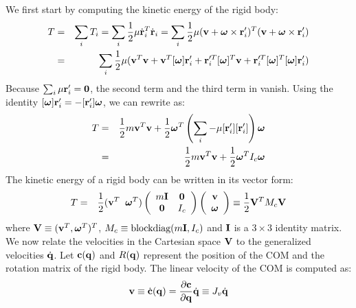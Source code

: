 We first start by computing the kinetic energy of the rigid body:
\begin{eqnarray}
\label{eq:rigid_kinetic}
T &=& \sum_i T_i = \sum_i \frac{1}{2}  \mathbf{\mu} \dot{\mathbf{r}}_i^{T}
    \dot{\mathbf{r}}_i = \sum_i \frac{1}{2}  \mathbf{\mu} (\mathbf{v} + \bm{\omega}
    \times \mathbf{r}_i')^T (\mathbf{v} + \boldsymbol{\bm{\omega}}
    \times \mathbf{r}_i') \nonumber \\
 &=& \sum_i \frac{1}{2}  \mathbf{\mu} (\mathbf{v}^T\mathbf{v} +
    \mathbf{v}^T [\bm{\omega}] \mathbf{r}_i' + \mathbf{r}_i'^T [\bm{\omega}]^T \mathbf{v} +
    \mathbf{r}_i'^T [\bm{\omega}]^T [\bm{\omega}] \mathbf{r}_i')
\end{eqnarray}
Because $\sum_i \mathbf{\mu}
\mathbf{r}_i' = \mathbf{0}$, the second term and the third term in  vanish. Using the identity $[\bm{\omega}]\mathbf{r}_i' =
-[\mathbf{r}_i']\bm{\omega}$, we can rewrite 
as:
\begin{eqnarray}
\nonumber
T & = & \frac{1}{2} m \mathbf{v}^T\mathbf{v} + \frac{1}{2} \bm{\omega}^T \left ( \sum_i -\mathbf{\mu}
 [\mathbf{r}_i'][\mathbf{r}_i'] \right ) \bm{\omega}\\
 & = & \frac{1}{2} m \mathbf{v}^T\mathbf{v} + \frac{1}{2} \bm{\omega}^T I_c \bm{\omega}
\end{eqnarray}
The kinetic energy of a rigid body can be written in its vector form:
\begin{eqnarray}
\label{eq:kinetic_vec}
T &=& \frac{1}{2} (\mathbf{v}^T \;\; \bm{\omega}^T)
\left(
\begin{array}{cc}
m\mathbf{I} & \mathbf{0} \\
\mathbf{0} & I_c
\end{array}
\right)
\left(
\begin{array}{c}
\mathbf{v} \\
\bm{\omega} 
\end{array}
\right)
 \equiv \frac{1}{2}\mathbf{V}^T M_c \mathbf{V}
\end{eqnarray}
where $\mathbf{V} \equiv (\mathbf{v}^T,\bm{\omega}^T)^T$, $M_c \equiv \mbox{blockdiag}(m\mathbf{I},I_c)$ and $\mathbf{I}$ is a $3\times3$ identity matrix. We now relate the velocities in the Cartesian space $\mathbf{V}$ to the generalized velocities $\dot{\mathbf{q}}$. Let $\mathbf{c}(\mathbf{q})$ and $R(\mathbf{q})$ represent the position of the COM and the rotation matrix of the rigid body. The linear velocity of the COM is computed as:
\begin{eqnarray}
\label{eq:vellin}
\mathbf{v} \equiv \dot{\mathbf{c}}(\mathbf{q}) = \frac{\partial \mathbf{c}}{\partial \mathbf{q}} \dot{\mathbf{q}} \equiv J_v \dot{\mathbf{q}}
\end{eqnarray}
